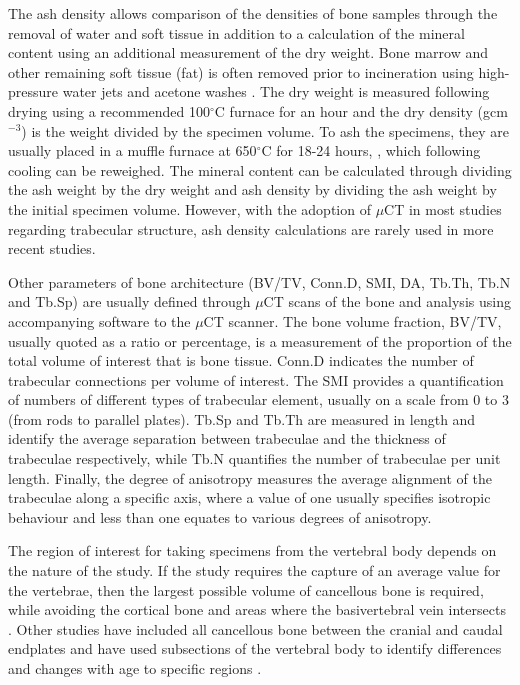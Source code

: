 The ash density allows comparison of the densities of bone samples
through the removal of water and soft tissue in addition to a
calculation of the mineral content using an additional measurement of
the dry weight. Bone marrow and other remaining soft tissue (fat) is
often removed prior to incineration using high-pressure water jets and
acetone washes \cite{keller1994predicting}. The dry weight is measured
following drying
using a recommended 100$^\circ$C furnace for an hour
\cite{keller1994predicting}
and
the dry
density (gcm$^{-3}$) is the weight divided by the specimen volume. To ash the
specimens, they are usually placed in a muffle furnace at 650$^\circ$C for
18-24
hours\cite{mosekilde1987biomechanical}, \cite{keller1994predicting}, which
following cooling can
be reweighed. The
mineral content can be calculated through dividing the ash weight by the
dry weight and ash density by dividing the ash weight by the initial
specimen volume. However, with the adoption of $\mu$CT in most studies
regarding trabecular structure, ash density calculations are rarely
used in more recent studies.

Other parameters of bone architecture (BV/TV, Conn.D, SMI, DA, Tb.Th,
Tb.N and Tb.Sp) are usually defined through $\mu$CT scans of the bone and
analysis using accompanying software to the $\mu$CT scanner. The bone volume fraction, BV/TV, usually
quoted as a ratio or percentage, is a measurement of the proportion of
the total volume of interest that is bone tissue. Conn.D indicates the
number of trabecular connections per volume of interest. The SMI
provides a quantification of numbers of different types of trabecular
element, usually on a scale from 0 to 3 (from rods to parallel
plates)\cite{hildebrand1997quantification}. Tb.Sp and Tb.Th are measured in
length and identify the
average separation between trabeculae and the thickness of trabeculae
respectively, while Tb.N quantifies the number of trabeculae per unit
length. Finally, the degree of anisotropy measures the average alignment
of the trabeculae along a specific axis, where a value of one usually
specifies isotropic behaviour and less than one equates to various
degrees of anisotropy\cite{hulme2007regional}.

The region of interest for taking specimens from the vertebral body
depends on the nature of the study. If the study requires the capture of an
average value for the vertebrae, then the largest possible
volume of cancellous bone is required, while avoiding the cortical bone
and areas where the basivertebral vein intersects
\cite{yoganandan2006}.
Other
studies
have included all cancellous bone between the cranial and caudal
endplates and have used subsections of the vertebral body to identify
differences and changes with age to specific regions \cite{hulme2007regional}.

